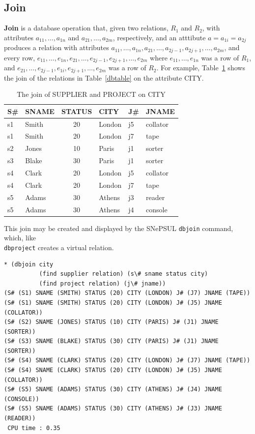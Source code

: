 \documentclass{book}
\begin{document}
\subsection{Join}
{\bf Join} is a database operation that, given two relations, $R_1$ and
$R_2$, with attributes $a_{11}, \ldots, a_{1n}$ and $a_{21}, \ldots,
a_{2m}$, respectively, and an atttibute $a=a_{1i}=a_{2j}$ produces a
relation with attributes $a_{11}, \ldots, a_{1n}, a_{21}, \ldots,
a_{2j-1}, a_{2j+1}, \ldots, a_{2m}$, and every row, $e_{11}, \ldots,
e_{1n}, e_{21}, \ldots, e_{2j-1}, e_{2j+1}, \ldots, e_{2m}$ where
$e_{11}, \ldots, e_{1n}$ was a row of $R_1$, and $e_{21}, \ldots,
e_{2j-1}, e_{1i}, e_{2j+1}, \ldots, e_{2m}$ was a row of $R_2$.  For
example, Table~\ref{dbtable2} shows the join of the relations in
Table~\ref{dbtable} on the attribute CITY.
\begin{table}[htb]
\caption{The join of SUPPLIER and PROJECT on CITY}\label{dbtable2}
\begin{center}
\begin{tabular}{|l|l|c|l|l|l|}\hline
S\# & SNAME & STATUS & CITY & J\# & JNAME\\\hline
s1 & Smith & 20 & London & j5 & collator\\
s1 & Smith & 20 & London & j7 & tape\\
s2 & Jones & 10 & Paris & j1 & sorter\\
s3 & Blake & 30 & Paris & j1 & sorter\\
s4 & Clark & 20 & London & j5 & collator\\
s4 & Clark & 20 & London & j7 & tape\\
s5 & Adams & 30 & Athens & j3 & reader\\
s5 & Adams & 30 & Athens & j4 & console\\\hline
\end{tabular} \hspace{0.5in}
\end{center}
\end{table}

This join may be created and displayed by the SNePSUL {\tt dbjoin}
command, which, like\\ {\tt dbproject} creates a virtual relation.
\begin{verbatim}
* (dbjoin city
          (find supplier relation) (s\# sname status city)
          (find project relation) (j\# jname))
(S# (S1) SNAME (SMITH) STATUS (20) CITY (LONDON) J# (J7) JNAME (TAPE))
(S# (S1) SNAME (SMITH) STATUS (20) CITY (LONDON) J# (J5) JNAME (COLLATOR))
(S# (S2) SNAME (JONES) STATUS (10) CITY (PARIS) J# (J1) JNAME (SORTER))
(S# (S3) SNAME (BLAKE) STATUS (30) CITY (PARIS) J# (J1) JNAME (SORTER))
(S# (S4) SNAME (CLARK) STATUS (20) CITY (LONDON) J# (J7) JNAME (TAPE))
(S# (S4) SNAME (CLARK) STATUS (20) CITY (LONDON) J# (J5) JNAME (COLLATOR))
(S# (S5) SNAME (ADAMS) STATUS (30) CITY (ATHENS) J# (J4) JNAME (CONSOLE))
(S# (S5) SNAME (ADAMS) STATUS (30) CITY (ATHENS) J# (J3) JNAME (READER))
 CPU time : 0.35 
\end{verbatim}
\end{document}
